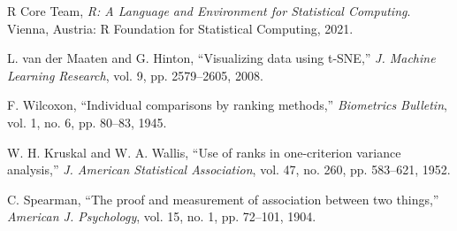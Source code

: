 \documentclass[conference]{IEEEtran}
\begin{document}
\begin{thebibliography}{00}
 R Core Team, \textit{R: A Language and Environment for Statistical Computing}. Vienna, Austria: R Foundation for Statistical Computing, 2021.

 L. van der Maaten and G. Hinton, ``Visualizing data using t-SNE,'' \textit{J. Machine Learning Research}, vol. 9, pp. 2579--2605, 2008.

 F. Wilcoxon, ``Individual comparisons by ranking methods,'' \textit{Biometrics Bulletin}, vol. 1, no. 6, pp. 80--83, 1945.

 W. H. Kruskal and W. A. Wallis, ``Use of ranks in one-criterion variance analysis,'' \textit{J. American Statistical Association}, vol. 47, no. 260, pp. 583--621, 1952.

 C. Spearman, ``The proof and measurement of association between two things,'' \textit{American J. Psychology}, vol. 15, no. 1, pp. 72--101, 1904.
\end{thebibliography}
\end{document}
